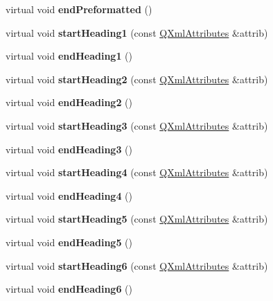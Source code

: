 \begin{DoxyCompactItemize}
virtual void {\bfseries end\+Preformatted} ()
\item 
\mbox{\label{class_markup_handler_abcdf1202f663ef0951133756678f118a}} 
virtual void {\bfseries start\+Heading1} (const \mbox{\hyperlink{class_q_xml_attributes}{Q\+Xml\+Attributes}} \&attrib)
\item 
\mbox{\label{class_markup_handler_aaeefa2a13a61a726d76927d03d2a4c72}} 
virtual void {\bfseries end\+Heading1} ()
\item 
\mbox{\label{class_markup_handler_a0ffb808feab8f54a140fb72a35e53ebe}} 
virtual void {\bfseries start\+Heading2} (const \mbox{\hyperlink{class_q_xml_attributes}{Q\+Xml\+Attributes}} \&attrib)
\item 
\mbox{\label{class_markup_handler_a98620a47e69a4e624183902316b5806d}} 
virtual void {\bfseries end\+Heading2} ()
\item 
\mbox{\label{class_markup_handler_a485e53a186a3325d8d68ab0afb56c870}} 
virtual void {\bfseries start\+Heading3} (const \mbox{\hyperlink{class_q_xml_attributes}{Q\+Xml\+Attributes}} \&attrib)
\item 
\mbox{\label{class_markup_handler_ad05665b0b5e9bd3caf1a42d1c3236349}} 
virtual void {\bfseries end\+Heading3} ()
\item 
\mbox{\label{class_markup_handler_a1e4e883a6fc9d36f6c2489d2b6904c75}} 
virtual void {\bfseries start\+Heading4} (const \mbox{\hyperlink{class_q_xml_attributes}{Q\+Xml\+Attributes}} \&attrib)
\item 
\mbox{\label{class_markup_handler_a64b4ee63bc504d88c588b3385df619b3}} 
virtual void {\bfseries end\+Heading4} ()
\item 
\mbox{\label{class_markup_handler_ae64b0b9f8f63d0ef75df2f6bb244eb6d}} 
virtual void {\bfseries start\+Heading5} (const \mbox{\hyperlink{class_q_xml_attributes}{Q\+Xml\+Attributes}} \&attrib)
\item 
\mbox{\label{class_markup_handler_a1329b52681ccfb72f20dba6ff9306902}} 
virtual void {\bfseries end\+Heading5} ()
\item 
\mbox{\label{class_markup_handler_a6069d241e1705f304aebdfea96b3c019}} 
virtual void {\bfseries start\+Heading6} (const \mbox{\hyperlink{class_q_xml_attributes}{Q\+Xml\+Attributes}} \&attrib)
\item 
\mbox{\label{class_markup_handler_a584dff5704d39d6e701756f8b13a2257}} 
virtual void {\bfseries end\+Heading6} ()
\end{DoxyCompactItemize}

